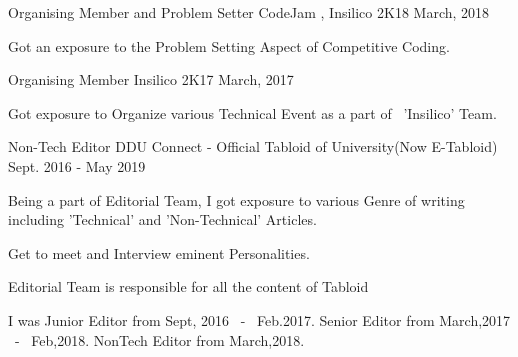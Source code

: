 


\begin{cventries}


\cventry
{Organising Member and Problem Setter} %
{CodeJam , Insilico 2K18} %
{March, 2018} %
{} %
{ %
\begin{cvitems}
\item {Got an exposure to the Problem Setting Aspect of Competitive Coding.}
\end{cvitems}
}


\cventry
{Organising Member} %
{Insilico 2K17} %
{March, 2017} %
{} %
{ %
\begin{cvitems}
\item {Got exposure to Organize various Technical Event as a part of ~'Insilico' Team.}
\end{cvitems}
}


\cventry
{Non-Tech Editor} %
{DDU Connect - Official Tabloid of University(Now E-Tabloid)} %
{Sept. 2016 - May 2019} %
{} %
{ %
\begin{cvitems}
\item {Being a part of Editorial Team, I got exposure to various Genre of writing including 'Technical' and 'Non-Technical' Articles.}
\item {Get to meet and Interview eminent Personalities.}
\item {Editorial Team is responsible for all the content of Tabloid}
\item {I was Junior Editor from Sept, 2016 ~-~ Feb.2017. Senior Editor from March,2017 ~-~ Feb,2018. NonTech Editor from March,2018.}
\end{cvitems}
}


\end{cventries}
